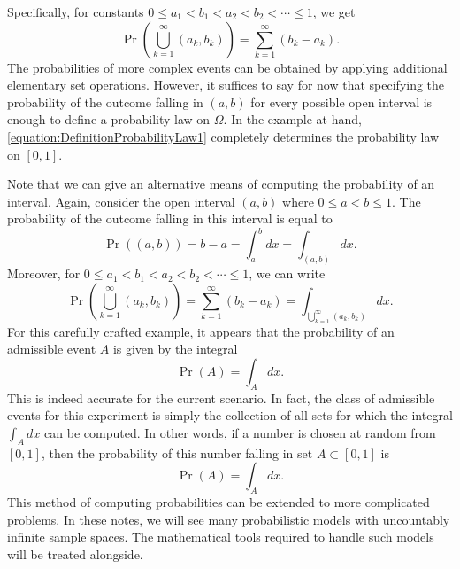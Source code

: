 Specifically, for constants $0 \leq a_1 < b_1 < a_2 < b_2 < \cdots \leq 1$, we get
\begin{equation*}
\Pr \left( \bigcup_{k=1}^{\infty} (a_k,b_k) \right)
= \sum_{k=1}^{\infty} \left( b_k - a_k \right) .
\end{equation*}
The probabilities of more complex events can be obtained by applying additional elementary set operations.
However, it suffices to say for now that specifying the probability of the outcome falling in $(a,b)$ for every possible open interval is enough to define a probability law on $\Omega$.
In the example at hand, \eqref{equation:DefinitionProbabilityLaw1} completely determines the probability law on $[0,1]$.

Note that we can give an alternative means of computing the probability of an interval.
Again, consider the open interval $(a, b)$ where $0 \leq a < b \leq 1$.
The probability of the outcome falling in this  interval is equal to
\begin{equation*}
\Pr ( (a, b) ) = b - a = \int_a^b dx = \int_{(a,b)} dx .
\end{equation*}
Moreover, for $0 \leq a_1 < b_1 < a_2 < b_2 < \cdots \leq 1$, we can write
\begin{equation*}
\Pr \left( \bigcup_{k=1}^{\infty} (a_k,b_k) \right)
= \sum_{k=1}^{\infty} \left( b_k - a_k \right)
= \int_{\bigcup_{k=1}^{\infty} (a_k,b_k)} dx .
\end{equation*}
For this carefully crafted example, it appears that the probability of an admissible event $A$ is given by the integral
\begin{equation*}
\Pr (A) = \int_{A} dx .
\end{equation*}
This is indeed accurate for the current scenario.
In fact, the class of admissible events for this experiment is simply the collection of all sets for which the integral $\int_A dx$ can be computed.
In other words, if a number is chosen at random from $[0,1]$, then the probability of this number falling in set $A \subset [0,1]$ is
\begin{equation*}
\Pr (A) = \int_{A} dx .
\end{equation*}
This method of computing probabilities can be extended to more complicated problems.
In these notes, we will see many probabilistic models with uncountably infinite sample spaces.
The mathematical tools required to handle such models will be treated alongside.


